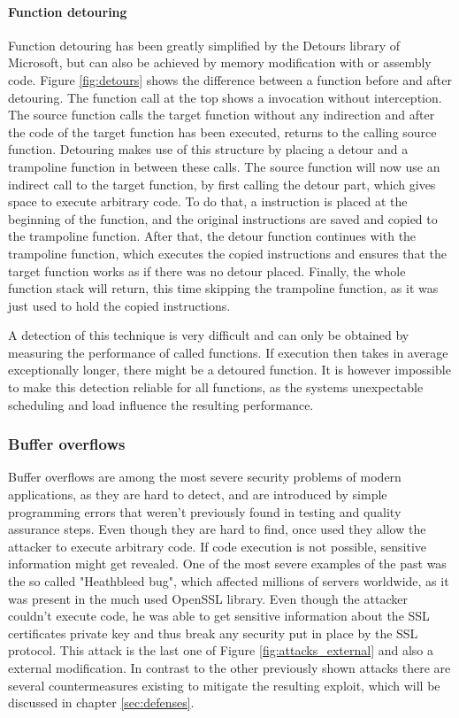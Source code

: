 \paragraph{Function detouring}

Function detouring has been greatly simplified by the Detours\cite{msdetours} library of Microsoft, but can also be achieved by memory modification with  or assembly code. Figure \ref{fig:detours} shows the difference between a function before and after detouring. The function call at the top shows a invocation without interception. The source function calls the target function without any indirection and after the code of the target function has been executed, returns to the calling source function. Detouring makes use of this structure by placing a detour and a trampoline function in between these calls. The source function will now use an indirect call to the target function, by first calling the detour part, which gives space to execute arbitrary code. To do that, a  instruction is placed at the beginning of the function, and the original instructions are saved and copied to the trampoline function. After that, the detour function continues with the trampoline function, which executes the copied instructions and ensures that the target function works as if there was no detour placed. Finally, the whole function stack will return, this time skipping the trampoline function, as it was just used to hold the copied instructions. 

A detection of this technique is very difficult and can only be obtained by measuring the performance of called functions. If execution then takes in average exceptionally longer, there might be a detoured function. It is however impossible to make this detection reliable for all functions, as the systems unexpectable scheduling and load influence the resulting performance.

\subsubsection{Buffer overflows}
Buffer overflows are among the most severe security problems of modern applications, as they are hard to detect, and are introduced by simple programming errors that weren't previously found in testing and quality assurance steps. Even though they are hard to find, once used they allow the attacker to execute arbitrary code. If code execution is not possible, sensitive information might get revealed. One of the most severe examples of the past was the so called "Heathbleed bug", which affected millions of servers worldwide, as it was present in the much used OpenSSL library. Even though the attacker couldn't execute code, he was able to get sensitive information about the SSL certificates private key and thus break any security put in place by the SSL protocol. This attack is the last one of Figure \ref{fig:attacks_external} and also a external modification. In contrast to the other previously shown attacks there are several countermeasures existing to mitigate the resulting exploit, which will be discussed in chapter \ref{sec:defenses}.

